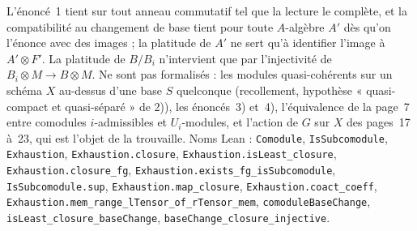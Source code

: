 \begin{remarque}
\raggedright L'énoncé~1 tient sur tout anneau commutatif tel que la lecture le complète, et la compatibilité au changement de base tient pour toute $A$-algèbre $A'$ dès qu'on l'énonce avec des images ; la platitude de $A'$ ne sert qu'à identifier l'image à $A' \otimes F'$. La platitude de $B/B_i$ n'intervient que par l'injectivité de $B_i \otimes M \to B \otimes M$. Ne sont pas formalisés : les modules quasi-cohérents sur un schéma $X$ au-dessus d'une base $S$ quelconque (recollement, hypothèse « quasi-compact et quasi-séparé » de 2)), les énoncés~3) et~4), l'équivalence de la page~7 entre comodules $i$-admissibles et $U_i$-modules, et l'action de $G$ sur $X$ des pages~17 à~23, qui est l'objet de la trouvaille. Noms Lean : \texttt{Comodule}, \texttt{IsSubcomodule}, \texttt{Exhaustion}, \texttt{Exhaustion.\allowbreak{}closure}, \texttt{Exhaustion.\allowbreak{}isLeast\_closure}, \texttt{Exhaustion.\allowbreak{}closure\_fg}, \texttt{Exhaustion.\allowbreak{}exists\_fg\_isSubcomodule}, \texttt{IsSubcomodule.\allowbreak{}sup}, \texttt{Exhaustion.\allowbreak{}map\_closure}, \texttt{Exhaustion.\allowbreak{}coact\_coeff}, \texttt{Exhaustion.\allowbreak{}mem\_range\_lTensor\_of\_rTensor\_mem}, \texttt{comoduleBaseChange}, \texttt{isLeast\_closure\_baseChange}, \texttt{baseChange\_closure\_injective}.
\end{remarque}
